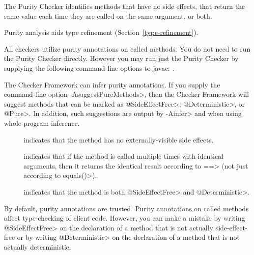 \htmlhr
{}

The Purity Checker identifies methods that have no side effects, that
return the same value each time they are called on the same argument, or both.

Purity analysis aids type refinement (Section~\ref{type-refinement}).

All checkers utilize purity annotations on called methods.
You do not need to run the Purity Checker directly.
However you may run just the Purity Checker by
supplying the following command-line options to javac:
.

The Checker Framework can infer purity annotations.
If you supply the command-line option \<-AsuggestPureMethods>, then the
Checker Framework will suggest methods that can be marked as
\<@SideEffectFree>, \<@Deterministic>, or \<@Pure>.
In addition, such suggestions are output by \<-Ainfer> and when using
whole-program inference.



\begin{description}

\item[]
  indicates that the method has no externally-visible side effects.

\item[]
  indicates that if the method is called multiple times with identical
  arguments, then it returns the identical result according to \<==>
  (not just according to \<equals()>).

\item[]
  indicates that the method is both \<@SideEffectFree> and \<@Deterministic>.

\end{description}



By default, purity annotations are trusted.  Purity annotations on called
methods affect type-checking of client code.  However, you can make a
mistake by writing \<@SideEffectFree> on the declaration of a method that
is not actually side-effect-free or by writing \<@Deterministic> on the
declaration of a method that is not actually deterministic.


